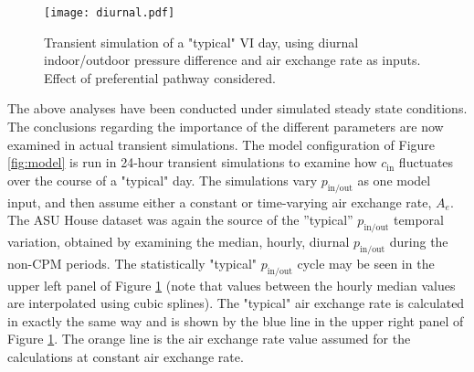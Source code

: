 \documentclass[journal=esthag,manuscript=article]{achemso}
\begin{document}
\begin{figure}
 \caption{Transient simulation of a "typical" VI day, using diurnal indoor/outdoor pressure difference and air exchange rate as inputs. Effect of preferential pathway considered.}\label{fig:diurnal}
 \texttt{[image: diurnal.pdf]}
\end{figure}

The above analyses have been conducted under simulated steady state conditions.
The conclusions regarding the importance of the different parameters are now examined in actual transient simulations.
The model configuration of Figure \ref{fig:model} is run in 24-hour transient simulations to examine how $c_\mathrm{in}$ fluctuates over the course  of a "typical" day.
The simulations vary $p_\mathrm{in/out}$ as one model input, and then assume either a constant or time-varying air exchange rate, $A_e$.
The ASU House dataset was again the source of the ”typical” $p_\mathrm{in/out}$ temporal variation, obtained by examining the median, hourly, diurnal $p_\mathrm{in/out}$ during the non-CPM periods.
The statistically "typical" $p_\mathrm{in/out}$ cycle may be seen in the upper left panel of Figure \ref{fig:diurnal} (note that values between the hourly median values are interpolated using cubic splines).
The "typical" air exchange rate is calculated in exactly the same way and is shown by the blue line in the upper right panel of Figure \ref{fig:diurnal}.
The orange line is the air exchange rate value assumed for the calculations at constant air exchange rate.\par
\end{document}
